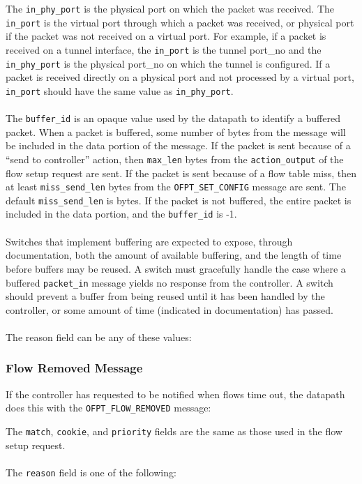 
The \verb|in_phy_port| is the physical port on which the packet was received. The \verb|in_port| is the virtual port through which a packet was received, or physical port if the packet was not received on a virtual port.  For example, if a packet is received on a tunnel interface, the \verb|in_port| is the tunnel port\_no and the \verb|in_phy_port| is the physical port\_no on which the tunnel is configured. If a packet is received directly on a physical port and not processed by a virtual port, \verb|in_port| should have the same value as \verb|in_phy_port|.
\\\\
The \verb|buffer_id| is an opaque value used by the datapath to identify a buffered packet.  When a packet is buffered, some number of bytes from the message will be included in the data portion of the message.  If the packet is sent because of a ``send to controller'' action, then \verb|max_len| bytes from the \verb|action_output| of the flow setup request are sent.  If the packet is sent because of a flow table miss, then at least \verb|miss_send_len| bytes from the \verb|OFPT_SET_CONFIG| message are sent.  The default \verb|miss_send_len| is bytes.  If the packet is not buffered, the entire packet is included in the data portion, and the \verb|buffer_id| is -1.  
\\\\
Switches that implement buffering are expected to expose, through documentation, both the amount of available buffering, and the length of time before buffers may be reused.  A switch must gracefully handle the case where a buffered \verb|packet_in| message yields no response from the controller.  A switch should prevent a buffer from being reused until it has been handled by the controller, or some amount of time (indicated in documentation) has passed.
\\\\
The reason field can be any of these values:


 
\subsubsection{Flow Removed Message}
If the controller has requested to be notified when flows time out, the datapath does this with the \verb|OFPT_FLOW_REMOVED| message:


The \verb|match|, \verb|cookie|, and \verb|priority| fields are the same as those used in the flow setup request.
\\\\
The \verb|reason| field is one of the following:

